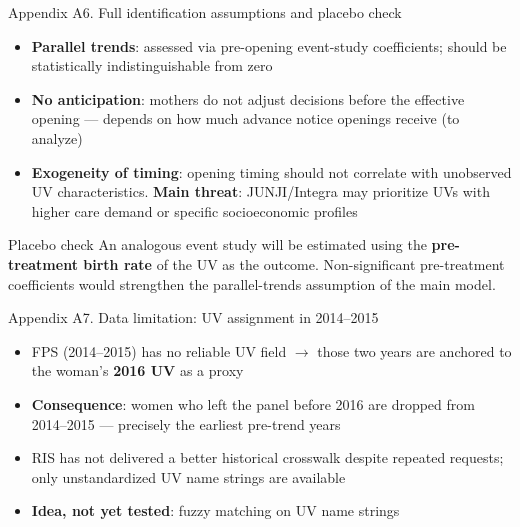 \documentclass[aspectratio=169,10pt]{beamer}
\begin{document}
\begin{frame}{Appendix A6. Full identification assumptions and placebo check}
\begin{itemize}
  \item \textbf{Parallel trends}: assessed via pre-opening event-study coefficients; should be statistically indistinguishable from zero
  \item \textbf{No anticipation}: mothers do not adjust decisions before the effective opening --- depends on how much advance notice openings receive (to analyze)
  \item \textbf{Exogeneity of timing}: opening timing should not correlate with unobserved UV characteristics. \textbf{Main threat}: JUNJI/Integra may prioritize UVs with higher care demand or specific socioeconomic profiles
\end{itemize}

\vspace{10pt}
\begin{block}{Placebo check}
\small An analogous event study will be estimated using the \textbf{pre-treatment birth rate} of the UV as the outcome. Non-significant pre-treatment coefficients would strengthen the parallel-trends assumption of the main model.
\end{block}
\end{frame}

\begin{frame}{Appendix A7. Data limitation: UV assignment in 2014--2015}
\begin{itemize}
  \item FPS (2014--2015) has no reliable UV field $\to$ those two years are anchored to the woman's \textbf{2016 UV} as a proxy
  \item \textbf{Consequence}: women who left the panel before 2016 are dropped from 2014--2015 --- precisely the earliest pre-trend years
  \item RIS has not delivered a better historical crosswalk despite repeated requests; only unstandardized UV name strings are available
  \item \textbf{Idea, not yet tested}: fuzzy matching on UV name strings
\end{itemize}
\end{frame}
\end{document}
